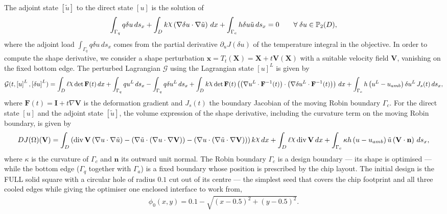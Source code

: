 \documentclass[preview]{standalone}
\let\oldcdot\cdot
\let\cdot\oldcdot
\begin{document}
The adjoint state $\left[ \tilde u\right]$ to the direct state $\left[ u\right]$ is the solution of
\begin{dmath*}
\int_{\Gamma_q} q \delta u \,ds_x +  \int_{D} k \raisebox{\depth}{$\chi$} \left(  \nabla \delta u  \cdot  \nabla \tilde u  \right) \,dx + \int_{\Gamma_c} h \delta u \tilde u \,ds_x = 0\qquad \forall\; {\delta u\in \mathbb P_{2}(D)} ,
\end{dmath*}
where the adjoint load $\int_{\Gamma_q} q \delta u \,ds_x$ comes from the partial derivative $\partial_{u} J(\delta u)$ of the temperature integral in the objective.
In order to compute the shape derivative, we consider a shape perturbation $\mathbf x = T_t(\mathbf X) = \mathbf X + t \mathbf  V(\mathbf X)$ with a suitable velocity field $\mathbf V$, vanishing on the fixed bottom edge.  The perturbed Lagrangian $\mathcal G$ using the Lagrangian state $\left[ u\right]^{L}$ is given by
\begin{dmath*}
\mathcal G(t,\left[ u\right]^{L},\left[ \delta u\right]^{L}) = \int_{D} \ell \raisebox{\depth}{$\chi$}  \operatorname{det}\mathbf F( t )  \,dx + \int_{\Gamma_q} q u^{L} \,ds_x -  \int_{\Gamma_q} q  \delta u^{L} \,ds_x +  \int_{D} k \raisebox{\depth}{$\chi$}  \operatorname{det}\mathbf F( t )  \left( \left(  \nabla u^{L} \cdot  \mathbf F^{-1}(t) \right) \cdot \left(  \nabla \delta u^{L} \cdot  \mathbf F^{-1}(t) \right) \right) \,dx + \int_{\Gamma_c} h \left( u^{L} - u_{amb}\right) \delta u^{L} \,J_{s}(t) \,ds_x ,
\end{dmath*}
where $\mathbf F(t) = \mathbf I + t \nabla \mathbf V$ is the deformation gradient and $J_{s}(t)$ the boundary Jacobian of the moving Robin boundary $\Gamma_c$.
For the direct state $\left[ u\right]$ and the adjoint state $\left[ \tilde u\right]$, the volume expression of the shape derivative, including the curvature term on the moving Robin boundary, is given by
\begin{dmath*}
DJ(\Omega)(\mathbf V) = \int_{D} \left(\operatorname{div} {\mathbf V} \left(  \nabla u  \cdot  \nabla \tilde u  \right) - \left(  \nabla \tilde u  \cdot \left(  \nabla u  \cdot  \nabla {\mathbf V}  \right) \right) - \left(  \nabla u  \cdot \left(  \nabla \tilde u  \cdot  \nabla {\mathbf V}  \right) \right)\right) k \raisebox{\depth}{$\chi$} \,dx + \int_{D} \ell \raisebox{\depth}{$\chi$} \operatorname{div} {\mathbf V} \,dx + \int_{\Gamma_c} \kappa h \left( u - u_{amb}\right) \tilde u \left(\mathbf V \cdot \mathbf n\right) \,ds_x ,
\end{dmath*}
where $\kappa$ is the curvature of $\Gamma_c$ and $\mathbf n$ its outward unit normal.  The Robin boundary $\Gamma_c$ is a design boundary — its shape is optimised — while the bottom edge ($\Gamma_q$ together with $\Gamma_a$) is a fixed boundary whose position is prescribed by the chip layout.
The initial design is the FULL solid square with a circular hole of radius $0.1$ cut out of its centre — the simplest seed that covers the chip footprint and all three cooled edges while giving the optimiser one enclosed interface to work from,
\begin{align*}
\phi_0(x,y) = 0.1 - \sqrt{\left( x - 0.5 \right)^{2} + \left( y - 0.5 \right)^{2}} .
\end{align*}
\end{document}
